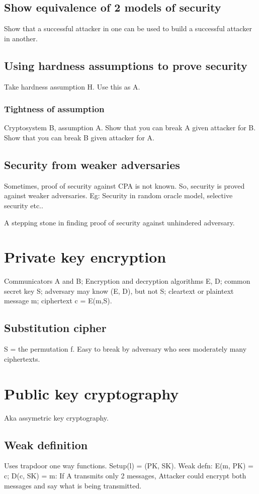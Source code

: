 \documentclass[oneside, article]{memoir}
\begin{document}
\subsection{Show equivalence of 2 models of security}
Show that a successful attacker in one can be used to build a successful attacker in another.

\subsection{Using hardness assumptions to prove security}
Take hardness assumption H. Use this as A.

\subsubsection{Tightness of assumption}
Cryptosystem B, assumption A. Show that you can break A given attacker for B. Show that you can break B given attacker for A.

\subsection{Security from weaker adversaries}
Sometimes, proof of security against CPA is not known. So, security is proved against weaker adversaries. Eg: Security in random oracle model, selective security etc..

A stepping stone in finding proof of security against unhindered adversary.


\section{Private key encryption}
Communicators A and B; Encryption and decryption algorithms E, D; common secret key S; adversary may know (E, D), but not S; cleartext or plaintext message m; ciphertext c = E(m,S).

\subsection{Substitution cipher}
S = the permutation f. Easy to break by adversary who sees moderately many ciphertexts. \why

\section{Public key cryptography}
Aka assymetric key cryptography.

\subsection{Weak definition}
Uses trapdoor one way functions. Setup(l) = (PK, SK). Weak defn: E(m, PK) = c; D(c, SK) = m: If A transmits only 2 messages, Attacker could encrypt both messages and say what is being transmitted.
\end{document}
